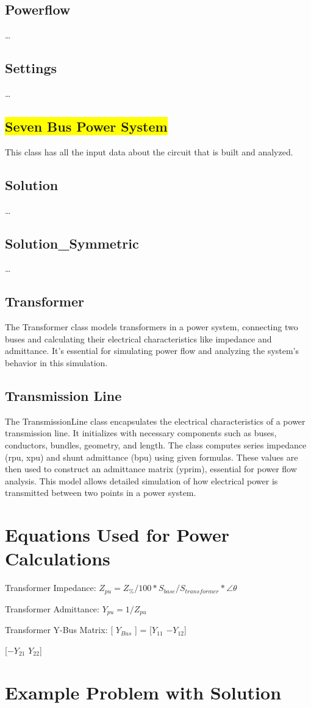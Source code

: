 \documentclass{article}
\begin{document}
	\subsection{Powerflow}
	\dots
	
	\subsection{Settings}
	\dots
	
	\subsection{\colorbox{yellow}{Seven Bus Power System}}
	This class has all the input data about the circuit that is built and analyzed.
	
	\subsection{Solution}
	\dots

	\subsection{Solution\_Symmetric}
	\dots	
	
	\subsection{Transformer}
	The Transformer class models transformers in a power system, connecting two buses and calculating their electrical characteristics like impedance and admittance. It's essential for simulating power flow and analyzing the system's behavior in this simulation.
	
	\subsection{Transmission Line}
	The TransmissionLine class encapsulates the electrical characteristics of a power transmission line. It initializes with necessary components such as buses, conductors, bundles, geometry, and length. The class computes series impedance (rpu, xpu) and shunt admittance (bpu) using given formulas. These values are then used to construct an admittance matrix (yprim), essential for power flow analysis. This model allows detailed simulation of how electrical power is transmitted between two points in a power system.
	
	\section{Equations Used for Power Calculations}
	\noindent
	Transformer Impedance: $Z_{pu} = Z_\% / 100 * S_{base} / S_{transformer} * \angle{\theta}$
	
	\noindent
	Transformer Admittance: $Y_{pu} = 1 / Z_{pu}$
	
	\noindent
	Transformer Y-Bus Matrix: [ $Y_{Bus}$ ] = [$Y_{11}$ $-Y_{12}$]
	
	\noindent
	\phantom{Transformer Y-Bus Matrix: [ $Y_{Bus}$ ] = }[$-Y_{21}$ $Y_{22}$]
	
	\section{Example Problem with Solution}
	
\end{document}
